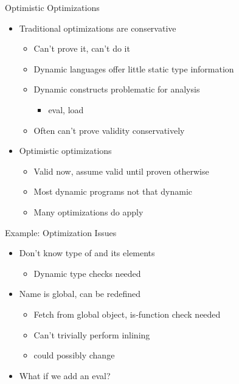 \begin{frame}{Optimistic Optimizations}
    \begin{itemize}
        \item Traditional optimizations are conservative
        \begin{itemize}
            \item Can't prove it, can't do it
            \item Dynamic languages offer little static type information
            \item Dynamic constructs problematic for analysis
            \begin{itemize}
                \item eval, load
            \end{itemize}
            \item Often can't prove validity conservatively
        \end{itemize}

        \item Optimistic optimizations
        \begin{itemize}
            \item Valid now, assume valid until proven otherwise
            \item Most dynamic programs not that dynamic
            \item Many optimizations do apply
        \end{itemize}
    \end{itemize}
\end{frame}

\begin{frame}{Example: Optimization Issues}
    
    \begin{itemize}
        \item Don't know type of  and its elements
        \begin{itemize}
            \item Dynamic type checks needed
        \end{itemize}
        \item Name  is global, can be redefined
        \begin{itemize}
            \item Fetch from global object, is-function check needed
            \item Can't trivially perform inlining
            \item {} could possibly change 
        \end{itemize}
        \item What if we add an eval?
    \end{itemize}
\end{frame}

